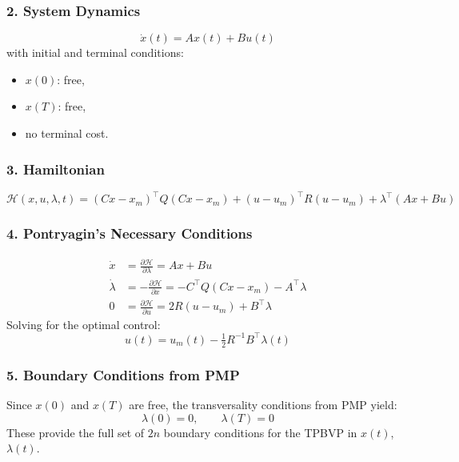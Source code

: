 \documentclass[11pt]{article}
\begin{document}
\subsubsection*{2. System Dynamics}

\begin{equation}
\dot{x}(t) = A x(t) + B u(t)
\end{equation}
with initial and terminal conditions:
\begin{itemize}
    \item \(x(0)\): free,
    \item \(x(T)\): free,
    \item no terminal cost.
\end{itemize}

\subsubsection*{3. Hamiltonian}

\begin{equation}
\mathcal{H}(x, u, \lambda, t) = (C x - x_m)^\top Q (C x - x_m) + (u - u_m)^\top R (u - u_m) + \lambda^\top (A x + B u)
\end{equation}

\subsubsection*{4. Pontryagin’s Necessary Conditions}

\begin{align}
\dot{x} &= \frac{\partial \mathcal{H}}{\partial \lambda} = A x + B u \\
\dot{\lambda} &= -\frac{\partial \mathcal{H}}{\partial x} = -C^\top Q (C x - x_m) - A^\top \lambda \\
0 &= \frac{\partial \mathcal{H}}{\partial u} = 2 R (u - u_m) + B^\top \lambda
\end{align}
Solving for the optimal control:
\begin{equation}
u(t) = u_m(t) - \tfrac{1}{2} R^{-1} B^\top \lambda(t)
\end{equation}

\subsubsection*{5. Boundary Conditions from PMP}

Since \(x(0)\) and \(x(T)\) are free, the transversality conditions from PMP yield:
\begin{equation}
\lambda(0) = 0, \qquad \lambda(T) = 0
\end{equation}
These provide the full set of \(2n\) boundary conditions for the TPBVP in \(x(t)\), \(\lambda(t)\).
\end{document}
